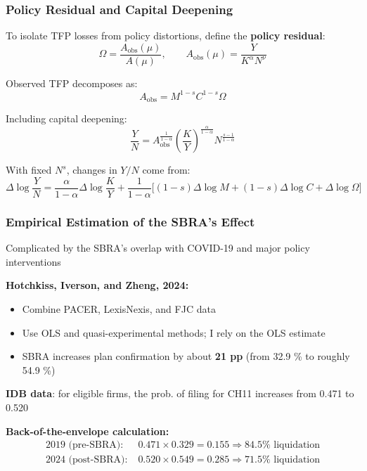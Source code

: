 \documentclass[aspectratio=169,xcolor=table]{beamer}
\begin{document}
\begin{frame}[label=decompC] \frametitle{Policy Residual and Capital Deepening \hfill \hyperlink{Decomp_main}{}}

To isolate TFP losses from policy distortions, define the \textbf{policy residual}:
\[
\Omega = \frac{A_{\text{obs}}(\mu)}{A(\mu)},
\qquad
A_{\text{obs}}(\mu) = \frac{Y}{K^{\alpha}N^{\nu}}
\]

Observed TFP decomposes as:
\[
A_{\text{obs}} = M^{1-s} C^{1-s} \Omega
\]

Including capital deepening:
\[
\frac{Y}{N} = A_{\text{obs}}^{\frac{1}{1-\alpha}}
\left(\frac{K}{Y}\right)^{\frac{\alpha}{1-\alpha}}
N^{\frac{s-1}{1-\alpha}}
\]

With fixed $N^s$, changes in $Y/N$ come from:
\[
\Delta\log\frac{Y}{N}
=\frac{\alpha}{1-\alpha}\Delta\log\frac{K}{Y}
+ \frac{1}{1-\alpha}\Big[
(1-s)\Delta\log M +
(1-s)\Delta\log C +
\Delta\log\Omega\Big]
\]

\end{frame}

\begin{frame}[label=sbra_data] \frametitle{Empirical Estimation of the SBRA’s Effect \hfill \hyperlink{sbra_effect}{}}

Complicated by the SBRA's overlap with COVID-19 and major policy interventions

\textbf{Hotchkiss, Iverson, and Zheng, 2024:}
\begin{itemize}\small
    \item Combine PACER, LexisNexis, and FJC data 
    \item Use OLS and quasi-experimental methods; I rely on the OLS estimate  
    \item SBRA increases plan confirmation by about \textbf{21 pp}  
          (from 32.9 \% to roughly 54.9 \%)
\end{itemize}
\vspace{3mm}

\textbf{IDB data}: for eligible firms, the prob. of filing for CH11 increases from 0.471 to 0.520 

\textbf{Back-of-the-envelope calculation:}
\[
\begin{aligned}
\text{2019 (pre-SBRA):}\;& 0.471 \times 0.329 = 0.155 \Rightarrow 84.5\% \text{ liquidation} \\
\text{2024 (post-SBRA):}\;& 0.520 \times 0.549 = 0.285 \Rightarrow 71.5\% \text{ liquidation}
\end{aligned}
\]

\end{frame}
\end{document}
